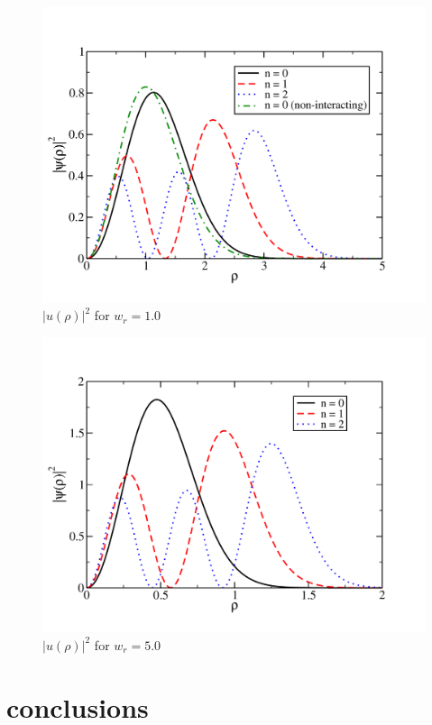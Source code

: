 \documentclass[prc,amsmath,twocolumn,superscriptaddress]{revtex4}
\begin{document}
\begin{figure}[h]
\includegraphics[scale=0.33]{wf_1.pdf}
\caption{$|u(\rho)|^2$ for $w_r = 1.0$}
\label{algorithm}
\end{figure}

\begin{figure}[h]
\includegraphics[scale=0.33]{wf_5.pdf}
\caption{$|u(\rho)|^2$ for $w_r = 5.0$}
\label{algorithm}
\end{figure}


\section{conclusions}
\label{conc}


\end{document}
